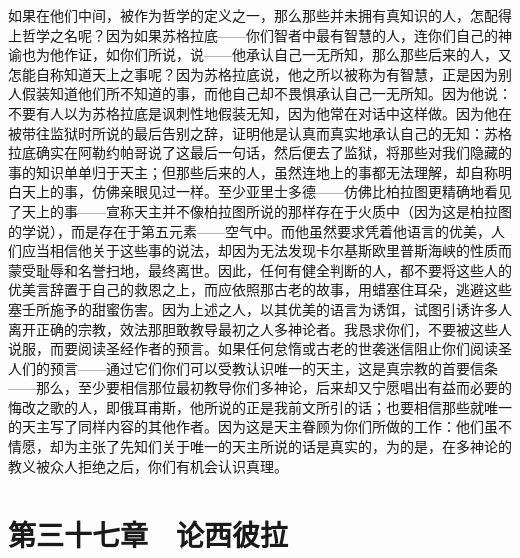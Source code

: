 如果在他们中间，被作为哲学的定义之一，那么那些并未拥有真知识的人，怎配得上哲学之名呢？因为如果苏格拉底——你们智者中最有智慧的人，连你们自己的神谕也为他作证，如你们所说，说——他承认自己一无所知，那么那些后来的人，又怎能自称知道天上之事呢？因为苏格拉底说，他之所以被称为有智慧，正是因为别人假装知道他们所不知道的事，而他自己却不畏惧承认自己一无所知。因为他说：不要有人以为苏格拉底是讽刺性地假装无知，因为他常在对话中这样做。因为他在被带往监狱时所说的最后告别之辞，证明他是认真而真实地承认自己的无知：苏格拉底确实在阿勒约帕哥说了这最后一句话，然后便去了监狱，将那些对我们隐藏的事的知识单单归于天主；但那些后来的人，虽然连地上的事都无法理解，却自称明白天上的事，仿佛亲眼见过一样。至少亚里士多德——仿佛比柏拉图更精确地看见了天上的事——宣称天主并不像柏拉图所说的那样存在于火质中（因为这是柏拉图的学说），而是存在于第五元素——空气中。而他虽然要求凭着他语言的优美，人们应当相信他关于这些事的说法，却因为无法发现卡尔基斯欧里普斯海峡的性质而蒙受耻辱和名誉扫地，最终离世。因此，任何有健全判断的人，都不要将这些人的优美言辞置于自己的救恩之上，而应依照那古老的故事，用蜡塞住耳朵，逃避这些塞壬所施予的甜蜜伤害。因为上述之人，以其优美的语言为诱饵，试图引诱许多人离开正确的宗教，效法那胆敢教导最初之人多神论者。我恳求你们，不要被这些人说服，而要阅读圣经作者的预言。如果任何怠惰或古老的世袭迷信阻止你们阅读圣人们的预言——通过它们你们可以受教认识唯一的天主，这是真宗教的首要信条——那么，至少要相信那位最初教导你们多神论，后来却又宁愿唱出有益而必要的悔改之歌的人，即俄耳甫斯，他所说的正是我前文所引的话；也要相信那些就唯一的天主写了同样内容的其他作者。因为这是天主眷顾为你们所做的工作：他们虽不情愿，却为主张了先知们关于唯一的天主所说的话是真实的，为的是，在多神论的教义被众人拒绝之后，你们有机会认识真理。\par


\section{第三十七章　论西彼拉}

